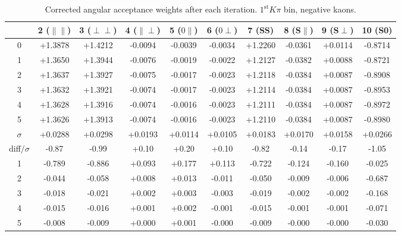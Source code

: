 \begin{table}[h!]
    \center\footnotesize
 \caption{\small Corrected angular acceptance weights after each iteration. $1^{\text{st}}K\pi$ bin, negative kaons.}  
     \begin{tabular}{c c c c c c c c c c}
     \hline
            & 2 ($\parallel\parallel$) & 3 ($\perp\perp$) & 4 ($\parallel\perp$) & 5 ($0\parallel$) & 
            6 ($0\perp$) & 7 (SS) & 8 (S$\parallel$) & 9 (S$\perp$) & 10 (S0) \\
       \hline
      0 & +1.3878 & +1.4212 & -0.0094 & -0.0039 & -0.0034 & +1.2260 & -0.0361 & +0.0114 & -0.8714\\
      1 & +1.3650 & +1.3944 & -0.0076 & -0.0019 & -0.0022 & +1.2127 & -0.0382 & +0.0088 & -0.8721\\
      2 & +1.3637 & +1.3927 & -0.0075 & -0.0017 & -0.0023 & +1.2118 & -0.0384 & +0.0087 & -0.8908\\
      3 & +1.3632 & +1.3921 & -0.0074 & -0.0017 & -0.0023 & +1.2114 & -0.0384 & +0.0087 & -0.8953\\
      4 & +1.3628 & +1.3916 & -0.0074 & -0.0016 & -0.0023 & +1.2111 & -0.0384 & +0.0087 & -0.8972\\
      5 & +1.3626 & +1.3913 & -0.0074 & -0.0016 & -0.0023 & +1.2110 & -0.0384 & +0.0087 & -0.8980\\
     \hline
      $\sigma$ & +0.0288 & +0.0298 & +0.0193 & +0.0114 & +0.0105 & +0.0183 & +0.0170 & +0.0158 & +0.0266\\
     diff$/\sigma$& -0.87  & -0.99  & +0.10  & +0.20  & +0.10  & -0.82  & -0.14  & -0.17  & -1.05 \\
       \hline
      1 & -0.789  & -0.886  & +0.093  & +0.177  & +0.113  & -0.722  & -0.124  & -0.160  & -0.025 \\
      2 & -0.044  & -0.058  & +0.008  & +0.013  & -0.011  & -0.050  & -0.009  & -0.006  & -0.687 \\
      3 & -0.018  & -0.021  & +0.002  & +0.003  & -0.003  & -0.019  & -0.002  & -0.002  & -0.168 \\
      4 & -0.015  & -0.016  & +0.001  & +0.002  & -0.001  & -0.015  & -0.001  & -0.001  & -0.071 \\
      5 & -0.008  & -0.009  & +0.000  & +0.001  & -0.000  & -0.009  & -0.000  & -0.000  & -0.030 \\
          \end{tabular}
     \label{tab:norm_weights_evolution_5}
\end{table}
